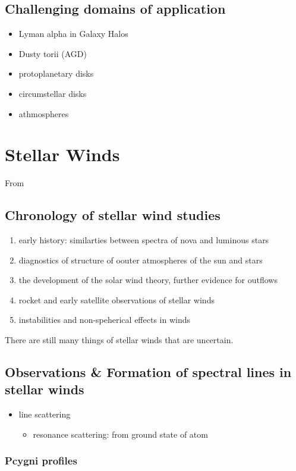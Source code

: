 \documentclass[../main/main.tex]{subfiles}
\begin{document}
\subsection{Challenging domains of application}
\begin{itemize}
\item Lyman alpha in Galaxy Halos
\item Dusty torii (AGD)
\item protoplanetary disks
\item circumstellar disks
\item athmospheres
\end{itemize}


\section{Stellar Winds}
From \cite{introStellarWindsLamersCassinelli1999}

\subsection{Chronology of stellar wind studies}
\begin{enumerate}
\item early history: similarties between spectra of nova and luminous stars
\item diagnostics of structure of oouter atmospheres of the sun and stars
\item the development of the solar wind theory, further evidence for outflows
\item rocket and early satellite observations of stellar winds
\item instabilities and non-speherical effects in winds
\end{enumerate}
There are still many things of stellar winds that are uncertain.

\subsection{Observations \& Formation of spectral lines in stellar winds}
\begin{itemize}
\item line scattering
\begin{itemize}
\item resonance scattering: from ground state of atom
\end{itemize}
\end{itemize}

\subsubsection{Pcygni profiles}
\end{document}

